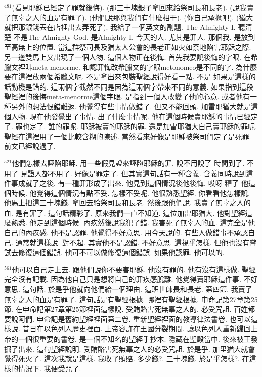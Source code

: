 \documentclass{book}
\begin{document}
$^{481}$(看見耶穌已經定了罪就後悔).
(那三十塊銀子拿回來給祭司長和長老).
(說我賣了無辜之人的血是有罪了).
(他們說那與我們有什麼相干).
(你自己承擔吧).
(猶大就把那銀錢丟在店裡出去弄死了).
我給了一個英文的副題.
The Almighty I.
聽清楚 不是The Almighty God.
是Almighty I.
今天的人.
尤其是罪人.
那個我.
是放到至高無上的位置.
當這群祭司長及猶太人公會的長老正如火如荼地陷害耶穌之際.
另一邊雙馬上又出現了一個人物.
這個人物正在後悔.
首先我要說後悔的字眼.
在希臘文裡叫meta-menorme.
和認罪悔改希臘文的字眼metonomeo是不同的字.
為什麼要在這裡放兩個希臘文呢.
不是拿出來包裝聖經說得好看一點.
不是 如果是這樣的話動機是錯的.
這兩個字截然不同是因為這兩個字帶來不同的意義.
如果指到這段聖經裡的後悔meta-menorme這個字眼.
是指到一個人改變了他的心意.
或者他有一種另外的想法恨錯難返.
他覺得有些事情做錯了.
但又不能回頭.
加雷耶猶大就是這個人物.
現在他發覺出了事情.
出了什麼事情呢.
他在這個時候賣耶穌的事情已經定了.
罪也定了.
誰的罪呢.
耶穌被賣的耶穌的罪.
還是加雷耶猶大自己賣耶穌的罪呢.
聖經在這裡用了一個比較含糊的陳述.
當然看來好像是耶穌被祭司們定了是死罪.
前文已經說過了.

$^{521}$他們怎樣去誣陷耶穌.
用一些假見證來誣陷耶穌的罪.
說不用說了 時間到了.
不用了 見證人都不用了.
好像是罪定了.
但其實這句話有一種含義.
含義同時說到這件事成就了之後.
有一種罪形成了出來.
他見到這個情況後他後悔.
哎呀 糟了 他這個時候.
他覺得這個情況有點不妥.
怎樣不妥呢.
他很熟悉聖經.
你看看他怎樣說.
他馬上把這三十塊錢.
拿回去給祭司長和長老.
然後跟他們說.
我賣了無辜之人的血.
是有罪了.
這句話精彩了.
原來我們一直不知道.
這位加雷耶猶大.
他對聖經這麼熟悉.
他走到這個時候.
內疚然後說我犯了錯.
我害死了無辜人的血.
這完全是他自己的內疚感.
他不是認罪.
他覺得不好意思.
用今天說的.
有些人做錯事不承認自己.
通常就這樣說.
對不起.
其實他不是認錯.
不好意思.
這視乎怎樣.
但他也沒有嘗試去修復這個錯誤.
他可不可以做修復這個錯誤.
如果他認罪.
他可以的.

$^{561}$他可以自己走上去.
跟他們說你不要害耶穌.
他沒有罪的.
他有沒有這樣做.
聖經完全沒有記載.
因為他自己只是想將自己的罪疚感脫離.
他覺得賣耶穌這件事.
不好意思.
這句話.
於是乎他就向他們給一個理由.
這班世師長和長老.
第四節.
我賣了無辜之人的血是有罪了.
這句話是有聖經根據.
哪裡有聖經根據.
申命記第27章第25節.
在申命記第27章第25節裡面這樣說.
受賄賂害死無辜之人的.
必受咒詛.
百姓都要說阿們.
申命記是舊約聖經裡面第二卷.
重新聖經裡面的教導律法書卷.
也可以這樣說.
昔日在以色列人歷史裡面.
上帝容許在王國分裂期間.
讓以色列人重新歸回上帝的一個很重要的書卷.
是一個不知名的聖經手抄本.
隱藏在聖殿當中.
後來被王發掘了出來.
這句聖經說明.
受賄賂害死無辜之人的必受咒詛.
於是乎.
加里猶大就會覺得死火了.
這次我就是這樣.
我收了賄賂.
多少錢?.
三十塊錢.
於是乎怎樣?.
在這樣的情況下.
我便受咒了.
\end{document}
